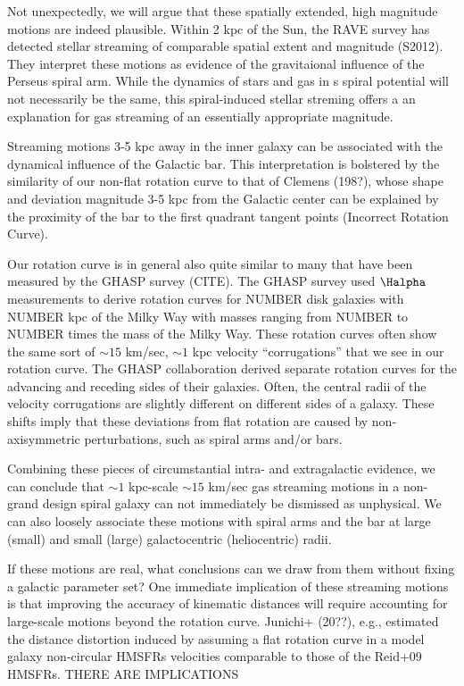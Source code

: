 Not unexpectedly, we will argue that these spatially extended, high magnitude motions are indeed plausible.
Within 2 kpc of the Sun, the RAVE survey has detected stellar streaming of comparable spatial extent and magnitude (S2012). They interpret these motions as evidence of the gravitaional influence of the Perseus spiral arm.
While the dynamics of stars and gas in s spiral potential will not necessarily be the same, this spiral-induced stellar streming offers a an explanation for gas streaming of an essentially appropriate magnitude.

Streaming motions 3-5 kpc away in the inner galaxy can be associated with the dynamical influence of the Galactic bar. 
This interpretation is bolstered by the similarity of our non-flat rotation curve to that of Clemens (198?), whose shape and deviation magnitude 3-5 kpc from the Galactic center can be explained by the proximity of the bar to the first quadrant tangent points (Incorrect Rotation Curve). 

Our rotation curve is in general also quite similar to many that have been measured by the GHASP survey (CITE). 
The GHASP survey used $\Halpha$ measurements to derive rotation curves for NUMBER disk galaxies with NUMBER kpc of the Milky Way with masses ranging from NUMBER to NUMBER times the mass of the Milky Way.
These rotation curves often show the same sort of $\sim 15$ km/sec, $\sim 1$ kpc velocity ``corrugations'' that we see in our rotation curve. 
The GHASP collaboration derived separate rotation curves for the advancing and receding sides of their galaxies.
Often, the central radii of the velocity corrugations are slightly different on different sides of a galaxy.
These shifts imply that these deviations from flat rotation are caused by non-axisymmetric perturbations, such as spiral arms and/or bars.

Combining these pieces of circumstantial intra- and extragalactic evidence, we can conclude that $\sim 1$ kpc-scale $\sim 15$ km/sec gas streaming motions in a non-grand design spiral galaxy can not immediately be dismissed as unphysical. 
We can also loosely associate these motions with spiral arms and the bar at large (small) and small (large) galactocentric (heliocentric) radii.

If these motions are real, what conclusions can we draw from them without fixing a galactic parameter set? One immediate implication of these streaming motions is that improving the accuracy of kinematic distances will require accounting for large-scale motions beyond the rotation curve. Junichi+ (20??), e.g., estimated the distance distortion induced by assuming a flat rotation curve in a model galaxy non-circular HMSFRs velocities comparable to those of the Reid+09 HMSFRs. 
THERE ARE IMPLICATIONS

